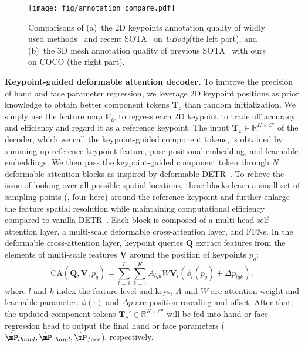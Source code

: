 \documentclass[10pt,twocolumn,letterpaper]{article}
\newcommand{\dataname}{\emph{UBody}\xspace}
\begin{document}
\begin{figure*}[h]
\begin{center}
\texttt{[image: fig/annotation\_compare.pdf]}
\end{center}
\vspace{-0.5cm}
\caption{
Comparisons of (a)~the 2D keypoints annotation quality of wildly used methods~\cite{ZheCao2018OpenPoseRM,FanZhang2020MediaPipeHO} and recent SOTA~\cite{YufeiXu2022ViTPoseSV} on \dataname (the left part), and (b)~the 3D mesh annotation quality of previous SOTA~\cite{Moon_2022NeuralAnnot} with ours on COCO (the right part).
}
\label{fig:ubody_vis_2d}
\vspace{-0.1cm}
\end{figure*}
\noindent \textbf{Keypoint-guided deformable attention decoder.}
To improve the precision of hand and face parameter regression, we leverage 2D keypoint positions as prior knowledge to obtain better component tokens $\mathbf{T_c}$ than random initialization.
We simply use the feature map $\mathbf{F}_{lr}$ to regress each 2D keypoint to trade off accuracy and efficiency and regard it as a reference keypoint. The input $\mathbf{T_c}\in \mathbb{R}^{K \times C'}$ of the decoder, which we call the keypoint-guided component tokens, is obtained by summing up reference keypoint feature, pose positional embedding, and learnable embeddings.
We then pass the keypoint-guided component token through $N$ deformable attention blocks as inspired by deformable DETR~\cite{Zhu_detr21}. To relieve the issue of looking over all possible spatial locations, these blocks learn a small set of sampling points (\eg, four here) around the reference keypoint and further enlarge the feature spatial resolution while maintaining computational efficiency compared to vanilla DETR~\cite{carion2020detr}.
Each block is composed of a multi-head self-attention layer, a multi-scale deformable cross-attention layer, and FFNs. In the deformable cross-attention layer, keypoint queries $\mathbf{Q}$ extract features from the elements of multi-scale features $\mathbf{V}$ around the position of keypoints $p_q$:
\begin{equation}
    \text{CA}(\mathbf{Q}, \mathbf{V}, p_q)=\sum_{l=1}^L\sum_{k=1}^KA_{lqk} W\mathbf{V}_l(\phi_l(p_q)+\Delta p_{lqk}),
\end{equation}
where $l$ and $k$ index the feature level and keys, $A$ and $W$  are attention weight and learnable parameter. $\phi(\cdot)$ and $\Delta p$ are position rescaling and offset. After that, the updated component tokens $\mathbf{T_c}'\in \mathbb{R}^{K \times C'}$ will be fed into hand or face regression head to output the final hand or face parameters ($\hat{\mP}_{lhand}, \hat{\mP}_{rhand}, \hat{\mP}_{face}$), respectively.
\end{document}
